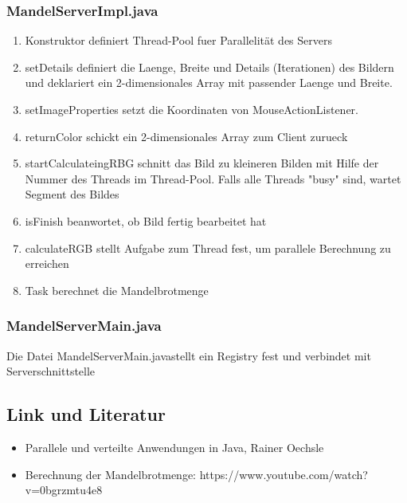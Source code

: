 \documentclass{article}
\begin{document}
	\subsubsection{MandelServerImpl.java}
	\begin{enumerate}
		\item Konstruktor definiert Thread-Pool fuer Parallelität des Servers
			
		\item setDetails definiert die Laenge, Breite und Details (Iterationen) des Bildern und deklariert ein 2-dimensionales Array mit passender Laenge und Breite.
			
		\item setImageProperties setzt die Koordinaten von MouseActionListener.
			
		\item returnColor schickt ein 2-dimensionales Array zum Client zurueck
			
		\newpage		
		\item startCalculateingRBG schnitt das Bild zu kleineren Bilden mit Hilfe der Nummer des Threads im Thread-Pool. Falls alle Threads "busy" sind, wartet Segment des Bildes 
			
		\item isFinish beanwortet, ob Bild fertig bearbeitet hat
			
		\item calculateRGB stellt Aufgabe zum Thread fest, um parallele Berechnung zu erreichen
			
		\newpage
		\item Task berechnet die Mandelbrotmenge
			
	\end{enumerate}
	
	\subsubsection{MandelServerMain.java}
	Die Datei \glqq MandelServerMain.java\grqq stellt ein Registry fest und verbindet mit Serverschnittstelle
	
	
	\newpage
	\subsection{Link und Literatur}
	\begin{itemize}
		\item Parallele und verteilte Anwendungen in Java, Rainer Oechsle
		\item Berechnung der Mandelbrotmenge: https://www.youtube.com/watch?v=0bgrzmtu4e8
	\end{itemize}
\end{document}
